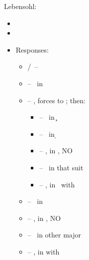 Lebensohl:

\begin{itemize}
  \item {}
  \item {}
  \item Responses:
    \begin{itemize}
      \item \pass/\dbl\ -- \pen
      \item \ctr{2\s} -- \inv\ in \s
      \item \ctr{2\nt} -- \art, forces to ; then:
        \begin{itemize}
          \item \pass -- \so\ in \c
          \item \ctr{3\d} -- \so\ in \d
          \item \ctr{3\opps} -- \gf,  in \om, NO \stopper
          \item \ctr{3\om} -- \gf\ in that suit
          \item \ctr{3\nt} -- \gf,  in \om\ with \stopper
        \end{itemize}
      \item \ctr{3\minor} -- \inv\ in \minor
      \item \ctr{3\opps} -- \gf,  in \om, NO \stopper
      \item \ctr{3\om} -- \inv\ in other major
      \item \ctr{3\nt} -- \gf,  in \om with \stopper
    \end{itemize}
\end{itemize}
